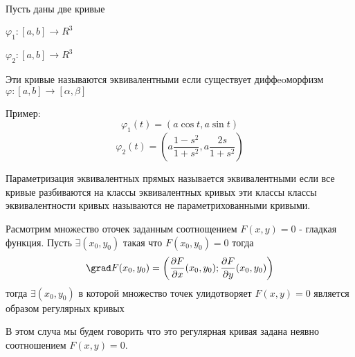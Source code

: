 \begin{define}
  Пусть даны две кривые

  $\varphi_1 : [a,b] \to R^3$

  $\varphi_2 : [a,b] \to R^3$

  Эти кривые называются эквивалентными если существует диффeoморфизм
  $\varphi : [a,b] \to [\alpha, \beta]$
\end{define}

Пример:
$$
\varphi_1(t) = (a\cos t, a \sin t)
$$
$$
\varphi_2(t) = (a \frac{1-s^2}{1+s^2}, a \frac{2s}{1+s^2})
$$

Параметризация эквивалентных прямых называется эквивалентными если все кривые
разбиваются на классы эквивалентных кривых эти классы классы эквивалентности
кривых называются не параметрихованными кривыми.

\begin{theorem}
  Расмотрим множество оточек заданным соотнощением $F(x, y) = 0$ - гладкая
  функция. Пусть $\exists (x_0, y_0)$ такая что $F(x_0, y_0) = 0$ тогда
  $$
  \grad F(x_0, y_0) = \left( \frac{\partial F}{\partial x}(x_0, y_0);
  \frac{\partial F}{\partial y}(x_0, y_0) \right)
  $$
  тогда $\exists (x_0, y_0)$ в которой множество точек улидотворяет
  $F(x, y) = 0$ является образом регулярных кривых

  В этом случа мы будем говорить что это регулярная кривая задана неявно
  соотношением $F(x, y) = 0$.
\end{theorem}

